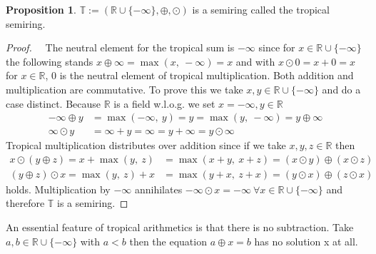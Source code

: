 \documentclass{article}
\theoremstyle{definition}
\newtheorem{proposition}[theorem]{Proposition}
\begin{document}
\begin{proposition}
$\mathbb{T} := ( \mathbb{R} \cup \{- \infty \} , \oplus , \odot )$ is a semiring called the tropical semiring. \cite[p.~10]{maclagan2015introduction}
\end{proposition}
\begin{proof}
~\
The neutral element for the tropical sum is $- \infty$ since for $x \in \mathbb{R} \cup \{- \infty \}$ the following stands $ x \oplus \infty = \max(x,\ - \infty) = x$ and with $x \odot 0 = x + 0 = x$ for $x \in \mathbb{R}$, $0$ is the neutral element of tropical multiplication. Both addition and multiplication are commutative. To prove this we take $x, y \in \mathbb{R} \cup \{- \infty \}$ and do a case distinct. Because $\mathbb{R}$ is a field w.l.o.g. we set $x= - \infty, y \in \mathbb{R}$
\begin{align*}
- \infty \oplus y &= \max (- \infty ,\ y) =   y = \max ( y,\ - \infty ) = y \oplus \infty \\
\infty \odot y &= \infty +y = \infty = y+ \infty = y \odot \infty
\end{align*}
Tropical multiplication distributes over addition since if we take $x, y, z \in \mathbb{R}$ then
\begin{align*}
x \odot (y \oplus z) = x + \max (y,\ z) &=   \max (x + y,\ x + z) = (x \odot y) \oplus (x \odot z) \\
(y \oplus z) \odot x = \max (y,\ z) + x &=   \max (y + x,\ z + x) = (y \odot x) \oplus (z \odot x)
\end{align*}
holds. Multiplication by $- \infty$ annihilates $- \infty \odot x = - \infty \: \forall x \in  \mathbb{R} \cup \{- \infty \}$ and therefore $\mathbb{T}$ is a semiring.
\end{proof}

An essential feature of tropical arithmetics is that there is no subtraction. Take $a, b \in \mathbb{R} \cup \{- \infty \}$ with $a < b$ then the equation $a \oplus x=b$ has no solution x at all. \cite[p.~11]{maclagan2015introduction} \\ \\
\end{document}
